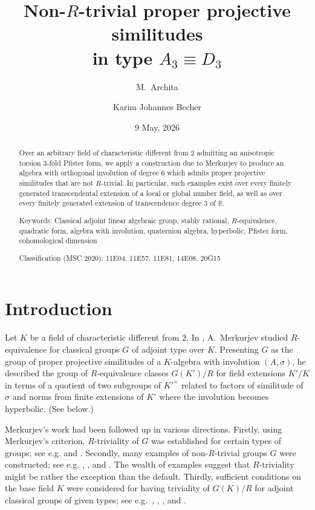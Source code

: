 \documentclass[twoside,11pt]{amsart}
\title[Non-$R$-trivial proper projective similitudes]{Non-$R$-trivial proper projective similitudes\\ in type $A_3\equiv D_3$}
\date{9 May, 2026}
\author{M.~Archita}
\author{Karim Johannes Becher}
\numberwithin{equation}{section}
\theoremstyle{definition}
\newcommand{\mg}[1]{{#1}^{\times}}
\newcommand{\s}{\sigma}
\newcommand{\rr}{\mathbb{R}}
\begin{document}
 \maketitle

\begin{abstract}
Over an arbitrary field  of characteristic different from $2$ admitting an anisotropic torsion $3$-fold Pfister form, we apply a construction due to Merkurjev to produce an algebra with orthogonal involution of degree $6$ which admits proper projective similitudes that are not $R$-trivial. 
In particular, such examples exist over every finitely generated transcendental extension of a local or global number field, as well as over every finitely generated extension of transcendence degree $3$ of $\rr$.


\medskip\noindent
{\sc Keywords:} 
Classical adjoint linear algebraic group, stably rational, $R$-equivalence, quadratic form, algebra with involution, quaternion algebra, hyperbolic, Pfister form, cohomological dimension

\medskip\noindent
{\sc Classification (MSC 2020):} 11E04, %
11E57, %
11E81, %
14E08, %
20G15 %
\end{abstract}

\section{Introduction}

Let $K$ be a field of characteristic different from $2$.
In \cite{Mer96}, A.~Merkurjev studied $R$-equivalence for classical groups $G$ of adjoint type over $K$.
Presenting $G$ as the group of proper projective similitudes of a $K$-algebra with involution $(A,\s)$, he described the group of  $R$-equivalence classes $G(K')/R$ for field extensions $K'/K$ in terms of a quotient of two subgroups of $\mg{K'}$ related to  factors of similitude of $\s$ and norms from finite extensions of $K'$ where the involution becomes hyperbolic. (See  below.)


Merkurjev's work had been followed up in various directions.
Firstly, using Merkurjev's criterion, $R$-triviality of $G$ was established for certain types of groups; see e.g. \cite{PTW12} and \cite{AB25}.
Secondly, many examples of non-$R$-trivial groups $G$ were constructed; see e.g. \cite{Gil97}, \cite{BMT04}, \cite{Bha14} and \cite{AB25}. The wealth of examples suggest that $R$-triviality might be rather the exception than the default.
Thirdly, sufficient conditions on the base field $K$ were considered  for having triviality of $G(K)/R$ for adjoint classical groups of given types; see e.g.~\cite{KP08}, \cite{PS15}, \cite{PS17}, \cite{AP22} and \cite{AB26}. 
\end{document}
